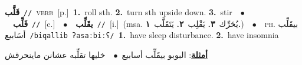 \documentclass[10pt,a4paper,twoside]{article} %
\begin{document}
\begin{multicols}{2}
{\setlength\topsep{0pt}\textbf{\foreignlanguage{arabic}{قَلَّب}}\ {\color{gray}\texttt{//}\color{black}}\ \textsc{verb}\ [p.]\ \textbf{1.}~roll sth.  \textbf{2.}~turn sth upside down.  \textbf{3.}~stir\ \ $\bullet$\ \ \setlength\topsep{0pt}\textbf{\foreignlanguage{arabic}{قَلِّب}}\ {\color{gray}\texttt{//}\color{black}}\ [c.]\ \ $\bullet$\ \ \setlength\topsep{0pt}\textbf{\foreignlanguage{arabic}{يقَلِّب}}\ {\color{gray}\texttt{//}\color{black}}\ [i.]\ \color{gray}(msa. \foreignlanguage{arabic}{يُحَرِّك}~\foreignlanguage{arabic}{\textbf{٣.}}  \foreignlanguage{arabic}{يَقْلِب}~\foreignlanguage{arabic}{\textbf{٢.}}  \foreignlanguage{arabic}{يَتَقَلَّب}~\foreignlanguage{arabic}{\textbf{١.}})\color{black}\ \ $\bullet$\ \ \textsc{ph.} \color{gray} \foreignlanguage{arabic}{بيقَلِّب أسَابيع}\color{black}\ {\color{gray}\texttt{/{\sffamily biqallib ʔasaːbiːʕ}/}\color{black}}\ \textbf{1.}~have sleep disturbance.  \textbf{2.}~have insomnia\  \begin{flushright}\color{gray}\foreignlanguage{arabic}{\textbf{\underline{\foreignlanguage{arabic}{أمثلة}}}: البوبو بيقَلِّب أسابيع\ $\bullet$\ \  خليها تقلِّبه عشانن ماينحرقش}\end{flushright}\color{black}} \vspace{2mm}


\end{multicols}
\end{document}
